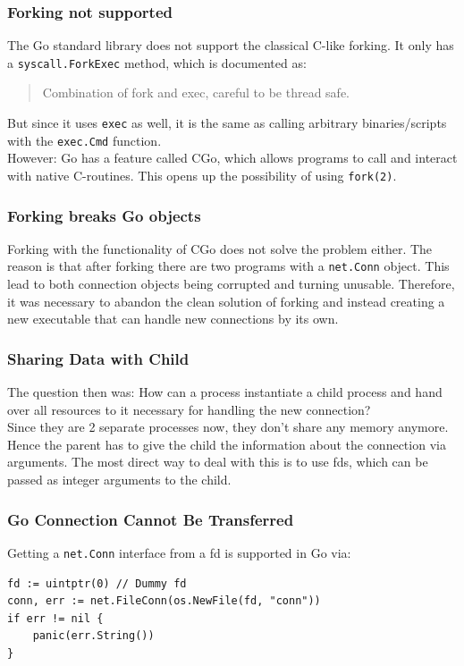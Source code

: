 \documentclass[10pt,a4paper,titlepage,twoside,english,final]{zhawreprt}
\begin{document}
\subsubsection{Forking not supported}\label{sssec:ForkingNotSupported}
The \gls{Go} standard library does not support the classical \gls{C}-like forking. It only has a \texttt{syscall.ForkExec} method, which is documented as:
\begin{quote}
Combination of fork and exec, careful to be thread safe.
\end{quote}
But since it uses \texttt{exec} as well, it is the same as calling arbitrary binaries/scripts with the \texttt{exec.Cmd} function.\\
However: \gls{Go} has a feature called \gls{CGo}, which allows programs to call and interact with native \gls{C}-routines. This opens up the possibility of using \texttt{fork(2)}.

\subsubsection{Forking breaks Go objects}\label{sssec:ForkingBreaksGoObjects}
Forking with the functionality of \gls{CGo} does not solve the problem either. The reason is that after forking there are two programs with a \texttt{net.Conn} object. This lead to both connection objects being corrupted and turning unusable. Therefore, it was necessary to abandon the clean solution of forking and instead creating a new executable that can handle new connections by its own.

\subsubsection{Sharing Data with Child}\label{sssec:SharingDataWithChild}
The question then was: How can a process instantiate a child process and hand over all resources to it necessary for handling the new connection?\\
Since they are 2 separate processes now, they don't share any memory anymore. Hence the parent has to give the child the information about the connection via arguments. The most direct way to deal with this is to use \glspl{fd}, which can be passed as integer arguments to the child.

\subsubsection{Go Connection Cannot Be Transferred}\label{sssec:GoConnectionCannotBeTransferred}
Getting a \texttt{net.Conn} interface from a \gls{fd} is supported in \gls{Go} via:
\setlistingGo
\begin{lstlisting}[caption={Getting a \texttt{net.Conn} interface from a \gls{fd}},label=lst:ConnFromFD]
fd := uintptr(0) // Dummy fd
conn, err := net.FileConn(os.NewFile(fd, "conn"))
if err != nil {
	panic(err.String())
}
\end{lstlisting}
\end{document}
